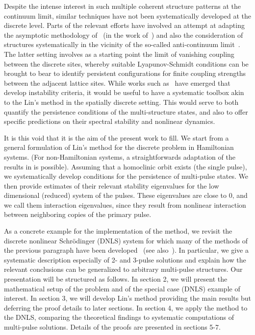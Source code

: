\documentclass[12pt]{article}
\begin{document}
Despite the intense interest in such multiple coherent
structure patterns at the continuum limit, similar 
techniques have not been systematically developed
at the discrete level. Parts of the relevant efforts
have involved an attempt at adapting the
asymptotic methodology of~\cite{elphick} 
(in the work of~\cite{kevold}) and also the consideration
of structures systematically in the vicinity of the
so-called anti-continuum limit~\cite{Pelinovsky2005}.
The latter setting involves as a starting point the
limit of vanishing coupling between the discrete sites,
whereby suitable Lyapunov-Schmidt conditions can 
be brought to bear to identify persistent configurations
for finite coupling strengths between the adjacent
lattice sites. While works such as~\cite{Kapitula2001a}
have emerged that develop instability criteria, it would
be useful to have a systematic toolbox akin to the Lin's
method in the spatially discrete setting. This would
serve to both quantify the persistence conditions of
the multi-structure states, and also to offer specific
predictions on their spectral stability and nonlinear
dynamics.

It is this void that it is the aim of the present work
to fill. We start from a general formulation of Lin's method
for the discrete problem in Hamiltonian systems. (For non-Hamiltonian systems, a straightforwards adaptation of the results in \cite{Sandstede1998} is possible). Assuming that a homoclinic orbit exists (the single pulse), we systematically develop conditions for the persistence of multi-pulse states. We then provide estimates of their relevant stability eigenvalues for the low dimensional (reduced) system of the pulses. These eigenvalues are close to 0, and we call them interaction eigenvalues, since they result from nonlinear interaction between neighboring copies of the primary pulse.

As a concrete example for the implementation of the method, we revisit the
discrete nonlinear Schr{\"o}dinger (DNLS) system for which many of the methods of the previous paragraph have been developed~\cite{Kevrekidis2009} (see also~\cite{pelinovsky_2011}). In particular, we give a 
systematic description especially of 2- and 3-pulse solutions and explain how the relevant conclusions can be generalized
to arbitrary multi-pulse structures. 
Our presentation will be structured as follows.
In section 2, we will present the mathematical
setup of the problem and of the special case (DNLS)
example of interest. In section 3, we will develop
Lin's method providing the main results but deferring
the proof details to later sections. In section 4,
we apply the method to the DNLS, comparing the theoretical
findings to systematic computations of multi-pulse solutions.
Details of the proofs are presented in sections 5-7.
\end{document}
